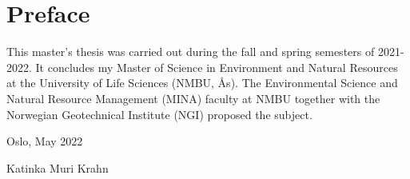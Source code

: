 \newpage

\section*{Preface}
This master's thesis was carried out during the fall and spring semesters of 2021-2022. It concludes my Master of Science in Environment and Natural Resources at the University of Life Sciences (NMBU, Ås). The Environmental Science and Natural Resource Management (MINA) faculty at NMBU together with the Norwegian Geotechnical Institute (NGI) proposed the subject. 

\vspace{3cm}

\begin{center}
Oslo, May 2022
\end{center}
\vspace{3cm}

\begin{center}
Katinka Muri Krahn
\end{center}


